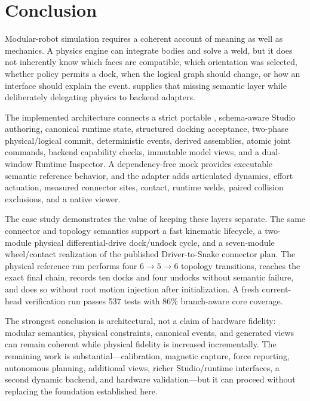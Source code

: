 \section{Conclusion}
\label{sec:conclusion}

Modular-robot simulation requires a coherent account of meaning as well as mechanics.
A physics engine can integrate bodies and solve a weld, but it does not inherently know
which faces are compatible, which orientation was selected, whether policy permits a
dock, when the logical graph should change, or how an interface should explain the
event. \modsim{} supplies that missing semantic layer while deliberately delegating
physics to backend adapters.

The implemented architecture connects a strict portable \robotpack{}, schema-aware
Studio authoring, canonical runtime state, structured docking acceptance, two-phase
physical/logical commit, deterministic events, derived assemblies, atomic joint
commands, backend capability checks, immutable model views, and a dual-window Runtime
Inspector. A dependency-free mock provides executable semantic reference behavior, and
the \mujoco{} adapter adds articulated dynamics, effort actuation, measured connector
sites, contact, runtime welds, paired collision exclusions, and a native viewer.

The \smoresep{} case study demonstrates the value of keeping these layers separate.
The same connector and topology semantics support a fast kinematic lifecycle, a
two-module physical differential-drive dock/undock cycle, and a seven-module
wheel/contact realization of the published Driver-to-Snake connector plan. The physical
reference run performs four $6\rightarrow5\rightarrow6$ topology transitions, reaches
the exact final chain, records ten docks and four undocks without semantic failure, and
does so without root motion injection after initialization. A fresh current-head
verification run passes 537 tests with 86\% branch-aware core coverage.

The strongest conclusion is architectural, not a claim of hardware fidelity: modular
semantics, physical constraints, canonical events, and generated views can remain
coherent while physical fidelity is increased incrementally. The remaining work is
substantial---calibration, magnetic capture, force reporting, autonomous planning,
additional views, richer Studio/runtime interfaces, a second dynamic backend, and
hardware validation---but it can proceed without replacing the foundation established
here.

